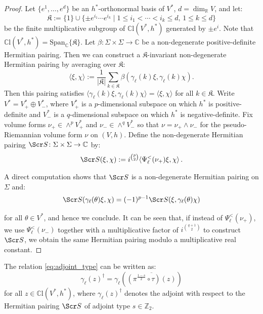 \documentclass[10pt,a4paper,twoside,reqno]{amsart}
\theoremstyle{plain}
\theoremstyle{definition}
\theoremstyle{remark}
\def\C{\mathbb{C}}
\def\R{\mathbb{R}}
\def\scS{\Scr S}
\def\R{\mathbb{R}}
\newcommand{\abs}[1]{\left\lvert#1\right\rvert}
\newcommand{\escal}[1]{\langle#1\rangle}
\def\Span{\mathrm{Span}}
\begin{document}
\begin{proof}
Let $\{e^1,\ldots,e^{d}\}$ be an $h^*$-orthonormal basis of $V^*$, $d=\dim_\R V$, and let: 
\begin{equation*}
\mathfrak{K} :=\{1\}\cup\{\pm e^{i_1}\cdots e^{i_k}\mid 1\leq i_1<\cdots<i_k\leq d,\,1\leq k\leq d\}
\end{equation*} 
be the finite multiplicative subgroup of $\C\mathrm{l}(V^*,h^*)$ generated by $\pm e^i$. Note that $\C\mathrm{l}(V^*,h^*)=\Span_\C\{ \mathfrak{K} \}$. Let $\beta\colon\Sigma\times\Sigma\to\C$ be a non-degenerate positive-definite Hermitian pairing. Then we can construct a $\mathfrak{K} $-invariant non-degenerate Hermitian pairing by averaging over $\mathfrak{K}$: 
\begin{equation*}
\escal{\xi,\chi}:=\frac{1}{\abs{\mathfrak{K}}}\sum_{k\in  \mathfrak{K}}\beta(\gamma_\ell(k)\xi,\gamma_\ell(k)\chi).
\end{equation*}
Then this pairing satisfies $\escal{\gamma_\ell(k)\xi,\gamma_\ell(k)\chi}=\escal{\xi,\chi}$ for all $k\in \mathfrak{K}$. Write $V^*=V^*_+\oplus V^*_-$, where $V^*_+$ is a $p$-dimensional subspace on which $h^*$ is positive-definite and $V^*_-$ is a $q$-dimensional subspace on which $h^*$ is negative-definite. Fix volume forms $\nu_+\in\wedge^pV^*_+$ and $\nu_-\in\wedge^qV^*_-$ so that $\nu = \nu_+\wedge\nu_-$ for the pseudo-Riemannian volume form $\nu$ on $(V,h)$. Define the non-degenerate Hermitian pairing $\scS \colon\Sigma\times\Sigma\to\C$ by:
\begin{eqnarray*}
\scS(\xi,\chi):= i^{\binom{p}{2}} \escal{\Psi^<_\ell(\nu_+)\xi,\chi}  \, .
\end{eqnarray*}

\noindent 
A direct computation shows that $\scS$ is a non-degenerate Hermitian pairing on $\Sigma$ and:
\begin{equation*}
\scS(\gamma_\ell(\theta)\xi,\chi)=(-1)^{p-1} \scS(\xi,\gamma_\ell (\theta)\chi)  
\end{equation*}

\noindent
for all $\theta\in V^*$, and hence we conclude. It can be seen that, if instead of $\Psi^<_\ell(\nu_{+})$, we use $\Psi^<_\ell(\nu_{-})$ together with a multiplicative factor of $i^{\binom{q+1}{2}}$ to construct $\scS$, we obtain the same Hermitian pairing modulo a multiplicative real constant.
\end{proof}

\noindent
The relation \eqref{eq:adjoint_type} can be written as: $$\gamma_\ell(z)^\dagger=\gamma_\ell(\overline{(\pi^{\frac{1-s}{2}}\circ\tau)(z)})$$ for all $z\in\C\mathrm{l}(V^*,h^*)$, where $\gamma_\ell(z)^\dagger$ denotes the adjoint with respect to the Hermitian pairing $\scS$ of adjoint type $s\in\mathbb{Z}_2$.\medskip
\end{document}
